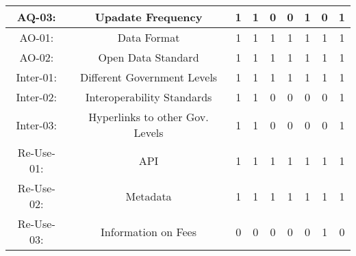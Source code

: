 \documentclass[a4paper, twoside]{report}
\begin{document}
\begin{table}[htbp]
\begin{adjustbox}{max width=\linewidth}
\begin{tabular}{rcccccccc}
    \multicolumn{1}{c}{AQ-03:} & \multicolumn{1}{p{19em}}{\cellcolor[rgb]{ .749,  .749,  .749}Upadate Frequency} & \cellcolor[rgb]{ .749,  .749,  .749}1 & \cellcolor[rgb]{ .749,  .749,  .749}1 & \cellcolor[rgb]{ .749,  .749,  .749}0 & \cellcolor[rgb]{ .749,  .749,  .749}0 & \cellcolor[rgb]{ .749,  .749,  .749}1 & \cellcolor[rgb]{ .749,  .749,  .749}0 & \cellcolor[rgb]{ .749,  .749,  .749}1 \\
    \midrule
    \multicolumn{1}{c}{AO-01:} & \multicolumn{1}{p{19em}}{Data Format} & 1     & 1     & 1     & 1     & 1     & 1     & 1 \\
    \multicolumn{1}{c}{AO-02:} & \multicolumn{1}{p{19em}}{\cellcolor[rgb]{ .749,  .749,  .749}Open Data Standard} & \cellcolor[rgb]{ .749,  .749,  .749}1 & \cellcolor[rgb]{ .749,  .749,  .749}1 & \cellcolor[rgb]{ .749,  .749,  .749}1 & \cellcolor[rgb]{ .749,  .749,  .749}1 & \cellcolor[rgb]{ .749,  .749,  .749}1 & \cellcolor[rgb]{ .749,  .749,  .749}1 & \cellcolor[rgb]{ .749,  .749,  .749}1 \\
    \midrule
    \multicolumn{1}{c}{Inter-01:} & \multicolumn{1}{p{19em}}{Different Government Levels} & 1     & 1     & 1     & 1     & 1     & 1     & 1 \\
    \multicolumn{1}{c}{Inter-02:} & \multicolumn{1}{p{19em}}{\cellcolor[rgb]{ .749,  .749,  .749}Interoperability Standards} & \cellcolor[rgb]{ .749,  .749,  .749}1 & \cellcolor[rgb]{ .749,  .749,  .749}1 & \cellcolor[rgb]{ .749,  .749,  .749}0 & \cellcolor[rgb]{ .749,  .749,  .749}0 & \cellcolor[rgb]{ .749,  .749,  .749}0 & \cellcolor[rgb]{ .749,  .749,  .749}0 & \cellcolor[rgb]{ .749,  .749,  .749}1 \\
    \multicolumn{1}{c}{Inter-03:} & \multicolumn{1}{p{19em}}{\cellcolor[rgb]{ .749,  .749,  .749}Hyperlinks to other Gov. Levels} & \cellcolor[rgb]{ .749,  .749,  .749}1 & \cellcolor[rgb]{ .749,  .749,  .749}1 & \cellcolor[rgb]{ .749,  .749,  .749}0 & \cellcolor[rgb]{ .749,  .749,  .749}0 & \cellcolor[rgb]{ .749,  .749,  .749}0 & \cellcolor[rgb]{ .749,  .749,  .749}0 & \cellcolor[rgb]{ .749,  .749,  .749}1 \\
    \multicolumn{1}{c}{Re-Use-01:} & \multicolumn{1}{p{19em}}{API} & 1     & 1     & 1     & 1     & 1     & 1     & 1 \\
    \multicolumn{1}{c}{Re-Use-02:} & \multicolumn{1}{p{19em}}{Metadata} & 1     & 1     & 1     & 1     & 1     & 1     & 1 \\
    \multicolumn{1}{c}{Re-Use-03:} & \multicolumn{1}{p{19em}}{Information on Fees} & 0     & 0     & 0     & 0     & 0     & 1     & 0 \\

\end{tabular}
\end{adjustbox}
\end{table}
\end{document}
